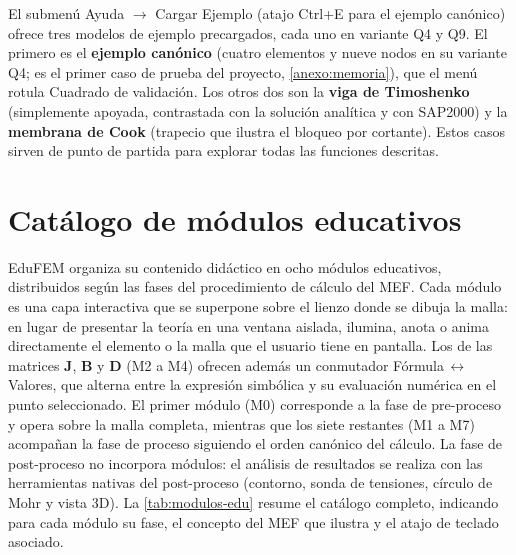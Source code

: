 El submenú \textsf{Ayuda} $\rightarrow$ \textsf{Cargar Ejemplo} (atajo Ctrl+E para el ejemplo canónico) ofrece tres modelos de ejemplo precargados, cada uno en variante Q4 y Q9. El primero es el \textbf{ejemplo canónico} (cuatro elementos y nueve nodos en su variante Q4; es el primer caso de prueba del proyecto, \autoref{anexo:memoria}), que el menú rotula \textsf{Cuadrado de validación}. Los otros dos son la \textbf{viga de Timoshenko} (simplemente apoyada, contrastada con la solución analítica y con SAP2000) y la \textbf{membrana de Cook} (trapecio que ilustra el bloqueo por cortante). Estos casos sirven de punto de partida para explorar todas las funciones descritas.


\section{Catálogo de módulos educativos}
\label{sec:catalogo-modulos-edu}

EduFEM organiza su contenido didáctico en ocho módulos educativos, distribuidos según las fases del procedimiento de cálculo del MEF. Cada módulo es una capa interactiva que se superpone sobre el lienzo donde se dibuja la malla: en lugar de presentar la teoría en una ventana aislada, ilumina, anota o anima directamente el elemento o la malla que el usuario tiene en pantalla. Los de las matrices $\bm{J}$, $\bm{B}$ y $\bm{D}$ (M2 a M4) ofrecen además un conmutador Fórmula\,$\leftrightarrow$\,Valores, que alterna entre la expresión simbólica y su evaluación numérica en el punto seleccionado. El primer módulo (M0) corresponde a la fase de pre-proceso y opera sobre la malla completa, mientras que los siete restantes (M1 a M7) acompañan la fase de proceso siguiendo el orden canónico del cálculo. La fase de post-proceso no incorpora módulos: el análisis de resultados se realiza con las herramientas nativas del post-proceso (contorno, sonda de tensiones, círculo de Mohr y vista 3D). La \autoref{tab:modulos-edu} resume el catálogo completo, indicando para cada módulo su fase, el concepto del MEF que ilustra y el atajo de teclado asociado.

